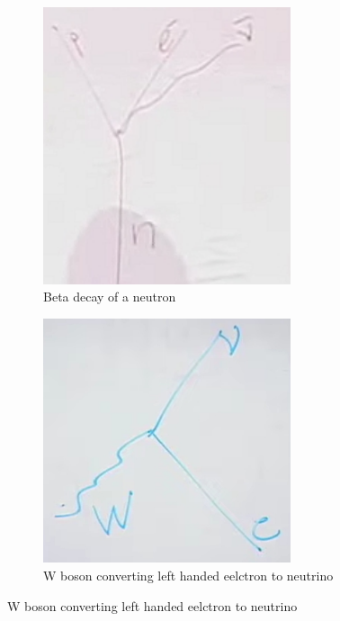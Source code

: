 \documentclass[]{article}
\begin{document}
\begin{figure}[H]
	\caption{The electron is always left handed in n weak interactions}
	\begin{subfigure}{0.4\textwidth}
		\caption{Beta decay of a neutron}\label{fig:2-9-beta-decay-neutron}
		\includegraphics[width=0.8\textwidth]{2-9-beta-decay-neutron}
	\end{subfigure}
	\begin{subfigure}{0.4\textwidth}
		\caption{W boson converting left handed eelctron to neutrino}\label{fig:2-9-W-boson}
		\includegraphics[width=0.8\textwidth]{2-9-W-boson}
	\end{subfigure}
\end{figure}
\end{document}
